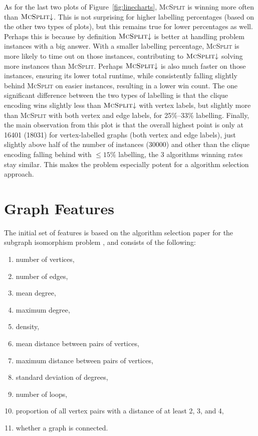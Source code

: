 \documentclass{l4proj}
\theoremstyle{definition}
\theoremstyle{remark}
\begin{document}
As for the last two plots of Figure~\ref{fig:linecharts}, \textsc{McSplit} is
winning more often than $\textsc{McSplit}{\downarrow}$. This is not surprising for
higher labelling percentages (based on the other two types of plots), but this
remains true for lower percentages as well. Perhaps this is because by
definition $\textsc{McSplit}{\downarrow}$ is better at handling problem instances
with a big answer. With a smaller labelling percentage, \textsc{McSplit} is more
likely to time out on those instances, contributing to
$\textsc{McSplit}{\downarrow}$ solving more instances than \textsc{McSplit}.
Perhaps $\textsc{McSplit}{\downarrow}$ is also much faster on those instances,
ensuring its lower total runtime, while consistently falling slightly behind
\textsc{McSplit} on easier instances, resulting in a lower win count. The one
significant difference between the two types of labelling is that the clique
encoding wins slightly less than $\textsc{McSplit}{\downarrow}$ with vertex
labels, but slightly more than \textsc{McSplit} with both vertex and edge
labels, for 25\%--33\% labelling. Finally, the main observation from this plot
is that the overall highest point is only at \num{16401} (\num{18031}) for
vertex-labelled graphs (both vertex and edge labels), just slightly above half
of the number of instances (\num{30000}) and other than the clique encoding
falling behind with $\le 15\%$ labelling, the 3 algorithms winning rates stay
similar. This makes the problem especially potent for a algorithm selection
approach.

\section{Graph Features} \label{sec:features}

The initial set of features is based on the algorithm selection paper for the
subgraph isomorphism problem \cite{DBLP:conf/lion/KotthoffMS16}, and consists of
the following:

\begin{enumerate}
\item number of vertices,
\item number of edges,
\item mean degree,
\item maximum degree,
\item density,
\item mean distance between pairs of vertices,
\item maximum distance between pairs of vertices,
\item standard deviation of degrees,
\item number of loops,
\item proportion of all vertex pairs with a distance of at least 2, 3, and 4,
\item whether a graph is connected.
\end{enumerate}
\end{document}
